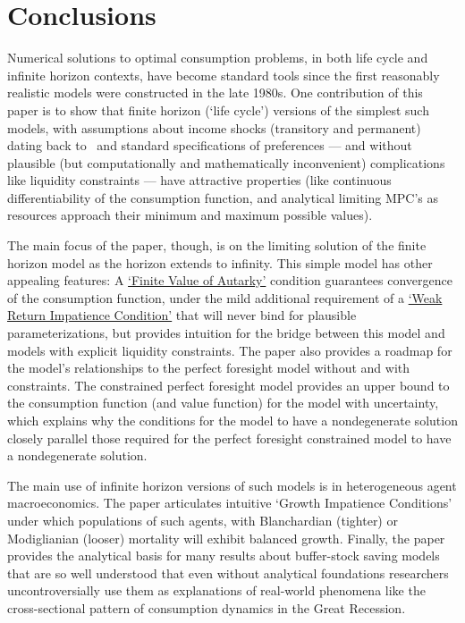 \documentclass[BufferStockTheory]{subfiles}
\begin{document}
\hypertarget{Conclusions}{}
\section{Conclusions}

Numerical solutions to optimal consumption problems, in both life cycle and infinite horizon contexts, have become standard tools since the first reasonably realistic models were constructed in the late 1980s. One contribution of this paper is to show that finite horizon (`life cycle') versions of the simplest such models, with assumptions about income shocks (transitory and permanent) dating back to~\cite{friedmanATheory} and standard specifications of preferences --- and without plausible (but computationally and mathematically inconvenient) complications like liquidity constraints --- have attractive properties (like continuous differentiability of the consumption function, and analytical limiting MPC's as resources approach their minimum and maximum possible values).%

The main focus of the paper, though, is on the limiting solution of the finite horizon model as the horizon extends to infinity.  This simple model has other appealing features: A \hyperlink{FVAC}{`Finite Value of Autarky'} condition guarantees convergence of the consumption function, under the mild additional requirement of a \hyperlink{WRIC}{`Weak Return Impatience Condition'} that will never bind for plausible parameterizations, but provides intuition for the bridge between this model and models with explicit liquidity constraints. The paper also provides a roadmap for the model's relationships to the perfect foresight model without and with constraints.  The constrained perfect foresight model provides an upper bound to the consumption function (and value function) for the model with uncertainty, which explains why the conditions for the model to have a nondegenerate solution closely parallel those required for the perfect foresight constrained model to have a nondegenerate solution.

The main use of infinite horizon versions of such models is in heterogeneous agent macroeconomics. The paper articulates intuitive `Growth Impatience Conditions' under which populations of such agents, with Blanchardian (tighter) or Modiglianian (looser) mortality will exhibit balanced growth.  Finally, the paper provides the analytical basis for many results about buffer-stock saving models that are so well understood that even without analytical foundations researchers uncontroversially use them as explanations of real-world phenomena like the cross-sectional pattern of consumption dynamics in the Great Recession.
\end{document}
